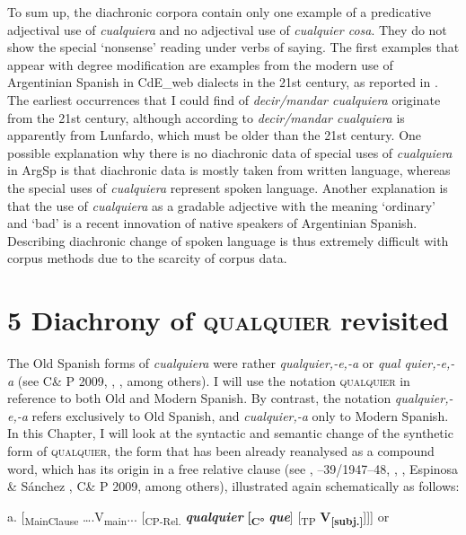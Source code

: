 \documentclass[output=paper]{langscibook}
\begin{document}
To sum up, the diachronic corpora contain only one example of a predicative adjectival use of \textit{cualquiera} and no adjectival use of \textit{cualquier cosa}. They do not show the special ‘nonsense’ reading under verbs of saying. The first examples that appear with degree modification are examples from the modern use of Argentinian Spanish in CdE\_web dialects in the 21st century, as reported in . The earliest occurrences that I could find of \textit{decir/mandar cualquiera} originate from the 21st century, although according to \citet{Conde2011} \textit{decir/mandar cualquiera} is apparently from Lunfardo, which must be older than the 21st century. One possible explanation why there is no diachronic data of special uses of \textit{cualquiera} in ArgSp is that diachronic data is mostly taken from written language, whereas the special uses of \textit{cualquiera} represent spoken language. Another explanation is that the use of \textit{cualquiera} as a gradable adjective with the meaning ‘ordinary’ and ‘bad’ is a recent innovation of native speakers of Argentinian Spanish. Describing diachronic change of spoken language is thus extremely difficult with corpus methods due to the scarcity of corpus data.

\section{\textbf{5} \textbf{Diachrony} \textbf{of} \textbf{\textsc{qualquier} }\textbf{revisited}}

The Old Spanish forms of \textit{cualquiera} were rather \textit{qualquier,\nobreakdash-e,\nobreakdash-a} or \textit{qual quier,\nobreakdash-e,\nobreakdash-a} (see C\& P 2009, \citealt{Pato2012}, \citealt{Mackenzie2019}, among others). I will use the notation \textsc{qualquier} in reference to both Old and Modern Spanish. By contrast, the notation \textit{qualquier,\nobreakdash-e,\nobreakdash-a} refers exclusively to Old Spanish, and \textit{cualquier,-a} only to Modern Spanish. In this Chapter, I will look at the syntactic and semantic change of the synthetic form of \textsc{qualquier}, the form that has been already reanalysed as a compound word, which has its origin in a free relative clause (see \citealt{Palomo1934}, \citealt{Lombard1938}–39/1947–48, \citealt{Meier1950}, \citealt{Rivero1988}, Espinosa \& Sánchez \citealt{Lancis2006}, C\& P 2009, among others), illustrated again schematically as follows:

  a.  [\textsubscript{MainClause} ….V\textsubscript{main}... [\textsubscript{CP-Rel.} \textbf{\textit{qualquier} }\textbf{[\textsubscript{C°}} \textbf{\textit{que}}] [\textsubscript{TP} \textbf{V\textsubscript{[subj.]}}]]] or 
\end{document}
